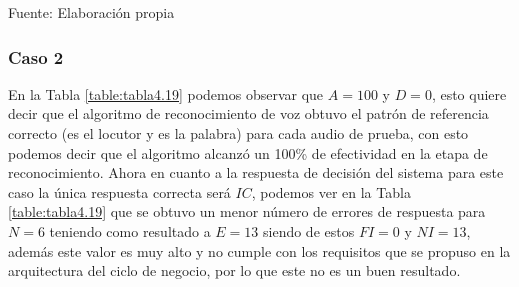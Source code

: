 \begin{center}
\begin{table}[H]
\centering
\caption{\small{Resultados para el caso 1 con U1 dinámico.}}
\label{table:tabla4.18}
\vskip 0.2cm
\begin{center}
\vskip 0.2cm
{\small{Fuente: Elaboración propia}}
\end{center}
\end{table}
\end{center}

\subsubsection{Caso 2}
En la Tabla \ref{table:tabla4.19} podemos observar que $A = 100$ y $D = 0$, esto quiere decir que el algoritmo de reconocimiento de voz obtuvo el patrón de referencia correcto (es el locutor y es la palabra) para cada audio de prueba, con esto podemos decir que el algoritmo alcanzó un 100\% de efectividad en la etapa de reconocimiento.
\vskip 0.5cm
Ahora en cuanto a la respuesta de decisión del sistema para este caso la única respuesta correcta será $IC$, podemos ver en la Tabla \ref{table:tabla4.19} que se obtuvo un menor número de errores de respuesta para $N = 6$ teniendo como resultado a $E = 13$ siendo de estos $FI = 0$ y $NI = 13$, además este valor es muy alto y no cumple con los requisitos que se propuso en la arquitectura del ciclo de negocio, por lo que este no es un buen resultado.

